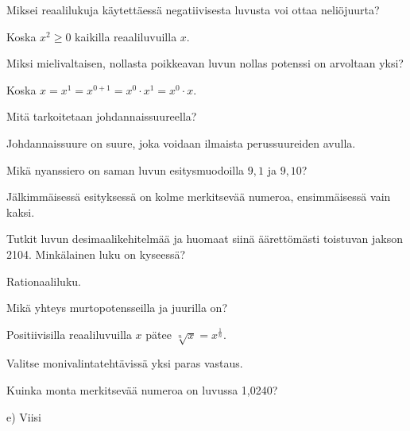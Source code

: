 \begin{tehtava}
Miksei reaalilukuja käytettäessä negatiivisesta luvusta voi ottaa neliöjuurta?
\begin{vastaus}
Koska $x^2 \geq 0$ kaikilla reaaliluvuilla $x$.
\end{vastaus}
\end{tehtava}

\begin{tehtava}
Miksi mielivaltaisen, nollasta poikkeavan luvun nollas potenssi on arvoltaan yksi?
\begin{vastaus}
Koska $x=x^1=x^{0+1}=x^0 \cdot x^1 = x^0 \cdot x$.
\end{vastaus}
\end{tehtava}

\begin{tehtava}
Mitä tarkoitetaan johdannaissuureella?
\begin{vastaus}
Johdannaissuure on suure, joka voidaan ilmaista perussuureiden avulla.
\end{vastaus}
\end{tehtava}

\begin{tehtava}
Mikä nyanssiero on saman luvun esitysmuodoilla $9,1$ ja $9,10$?
\begin{vastaus}
Jälkimmäisessä esityksessä on kolme merkitsevää numeroa, ensimmäisessä vain kaksi.
\end{vastaus}
\end{tehtava}

\begin{tehtava}
Tutkit luvun desimaalikehitelmää ja huomaat siinä äärettömästi toistuvan jakson 2104. Minkälainen luku on kyseessä?
\begin{vastaus}
Rationaaliluku.
\end{vastaus}
\end{tehtava}

\begin{tehtava}
Mikä yhteys murtopotensseilla ja juurilla on?
\begin{vastaus}
Positiivisilla reaaliluvuilla $x$ pätee $\sqrt[n]{x} = x^{\frac{1}{n}}$.
\end{vastaus}
\end{tehtava}

Valitse monivalintatehtävissä yksi paras vastaus.

\begin{tehtava}
Kuinka monta merkitsevää numeroa on luvussa 1,0240?
\begin{alakohdat}
\end{alakohdat}
\begin{vastaus}
e) Viisi
\end{vastaus}
\end{tehtava}

